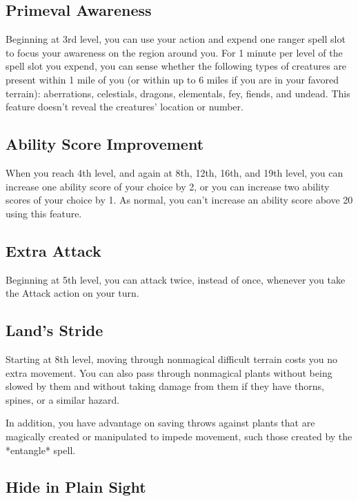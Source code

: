 \subsection{Primeval Awareness}

Beginning at 3rd level, you can use your action and expend one ranger spell slot to focus your awareness on the region around you. For 1 minute per level of the spell slot you expend, you can sense whether the following types of creatures are present within 1 mile of you (or within up to 6 miles if you are in your favored terrain): aberrations, celestials, dragons, elementals, fey, fiends, and undead. This feature doesn’t reveal the creatures’ location or number.

\subsection{Ability Score Improvement}

When you reach 4th level, and again at 8th, 12th, 16th, and 19th level, you can increase one ability score of your choice by 2, or you can increase two ability scores of your choice by 1. As normal, you can’t increase an ability score above 20 using this feature.

\subsection{Extra Attack}

Beginning at 5th level, you can attack twice, instead of once, whenever you take the Attack action on your turn.

\subsection{Land’s Stride}

Starting at 8th level, moving through nonmagical difficult terrain costs you no extra movement. You can also pass through nonmagical plants without being slowed by them and without taking damage from them if they have thorns, spines, or a similar hazard.

In addition, you have advantage on saving throws against plants that are magically created or manipulated to impede movement, such those created by the *entangle* spell.

\subsection{Hide in Plain Sight}

